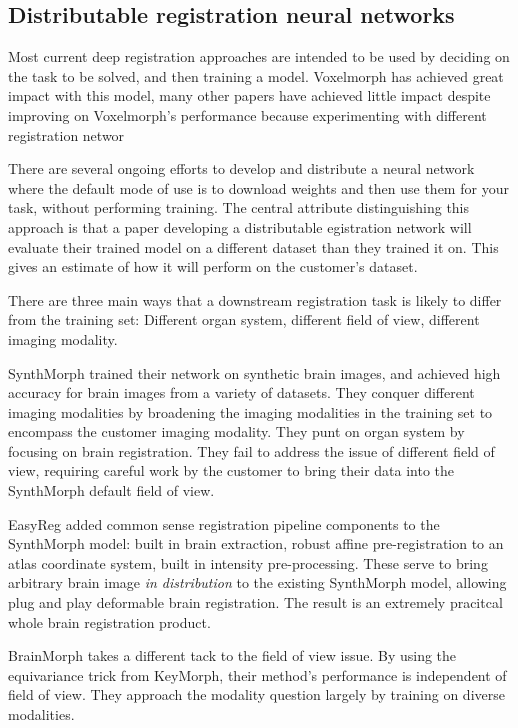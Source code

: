 \documentclass{article}
\begin{document}
\subsection{Distributable registration neural networks}

Most current deep registration approaches are intended to be used by deciding on the task to be solved, and then training a model. Voxelmorph \cite{balakrishnan2019voxelmorph} has achieved great impact with this model, many other papers have achieved little impact despite improving on Voxelmorph's performance because experimenting with different registration networ

There are several ongoing efforts to develop and distribute a neural network where the default mode of use is to download weights and then use them for your task, without performing training. The central attribute distinguishing this approach is that a paper 
developing a distributable egistration network will evaluate their trained model on a different dataset than they trained it on. This gives an estimate of how it will perform on the customer's dataset.

There are three main ways that a downstream registration task is likely to differ from the training set: Different organ system, different field of view, different imaging modality.

SynthMorph\cite{SynthMorph} trained their network on synthetic brain images, and achieved high accuracy for brain images from a variety of datasets. They conquer different imaging modalities by broadening the imaging modalities in the training set to encompass the customer imaging modality. They punt on organ system by focusing on brain registration. They fail to address the issue of different field of view, requiring careful work by the customer to bring their data into the SynthMorph default field of view.

EasyReg\cite{EasyReg} added common sense registration pipeline components to the SynthMorph model: built in brain extraction, robust affine pre-registration to an atlas coordinate system, built in intensity pre-processing. These serve to bring arbitrary brain image \emph{in distribution} to the existing SynthMorph model, allowing plug and play deformable brain registration. The result is an extremely pracitcal whole brain registration product.

BrainMorph\cite{BrainMorph} takes a different tack to the field of view issue. By using the equivariance trick from KeyMorph\cite{KeyMorph}, their method's performance is independent of field of view. They approach the modality question largely by training on diverse modalities.
\end{document}
